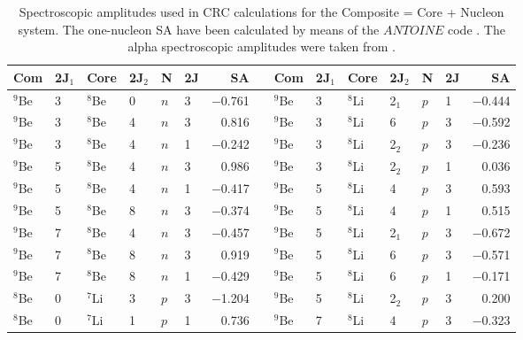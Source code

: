 \documentclass[
12pt, %
oneside, %
english, %
onehalfspacing, %
onehalfspacing, %
headsepline, %
]{MastersDoctoralThesis} %
\begin{document}
\begin{table*}[tp]
\footnotesize
\caption{\label{dbe_SA} \footnotesize Spectroscopic amplitudes used in CRC calculations for the Composite = Core + Nucleon system. The one-nucleon SA have been calculated by means of the $ANTOINE$ code \cite{antoine}. The alpha spectroscopic amplitudes were taken from  \cite{volya, volya2017}. }
\begin{tabular*}{\textwidth}{@{\extracolsep{\fill}}llllllrl@{\extracolsep{\fill}}llllllr@{\extracolsep{\fill}}}
\toprule
Com & 2J$_{1}$ & Core & 2J$_{2}$ & N & 2J & SA &    & Com & 2J$_{1}$ & Core & 2J$_{2}$ & N & 2J & SA      \\
\midrule 
$^9$Be  & 3  & ${}^8$Be   & 0   & $n$       & 3   & $-$0.761 &  & ${}^9$Be  & 3  & ${}^8$Li   & 2$_1$    & $p$       & 1   & $-$0.444  \\
$^9$Be  & 3  & ${}^8$Be   & 4   & $n$       & 3   & 0.816  &  & ${}^9$Be  & 3  & ${}^8$Li    & 6   & $p$       & 3   & $-$0.592  \\
$^9$Be  & 3  & ${}^8$Be   & 4   & $n$       & 1   & $-$0.242 &  & ${}^9$Be  & 3  & ${}^8$Li    & 2$_2$   & $p$       & 3   & $-$0.236  \\
$^9$Be  & 5  & ${}^8$Be   & 4   & $n$       & 3   & 0.986  &  & ${}^9$Be  & 3  & ${}^8$Li    & 2$_2$   & $p$       & 1   & 0.036   \\
$^9$Be  & 5  & ${}^8$Be   & 4   & $n$       & 1   & $-$0.417 &  & ${}^9$Be  & 5  & ${}^8$Li    & 4   & $p$       & 3   & 0.593   \\
$^9$Be  & 5  & ${}^8$Be   & 8   & $n$       & 3   & $-$0.374 &  & ${}^9$Be  & 5  & ${}^8$Li    & 4   & $p$       & 1   & 0.515   \\
$^9$Be  & 7  & ${}^8$Be   & 4   & $n$       & 3   & $-$0.457 &  & ${}^9$Be  & 5  & ${}^8$Li   & 2$_1$    & $p$       & 3   & $-$0.672  \\
$^9$Be  & 7  & ${}^8$Be   & 8   & $n$       & 3   & 0.919  &  & ${}^9$Be  & 5  & ${}^8$Li    & 6   & $p$       & 3   & $-$0.571  \\
$^9$Be  & 7  & ${}^8$Be   & 8   & $n$       & 1   & $-$0.429 &  & ${}^9$Be  & 5  & ${}^8$Li    & 6   & $p$       & 1   & $-$0.171  \\
$^8$Be  & 0  & ${}^7$Li   & 3   & $p$       & 3   & $-$1.204 &  & ${}^9$Be  & 5  & ${}^8$Li    & 2$_2$   & $p$       & 3   & 0.200     \\
$^8$Be  & 0  & ${}^7$Li   & 1   & $p$       & 1   & 0.736  &  & ${}^9$Be  & 7  & ${}^8$Li    & 4   & $p$       & 3   & $-$0.323  \\

\end{tabular*}
\end{table*}
\end{document}
